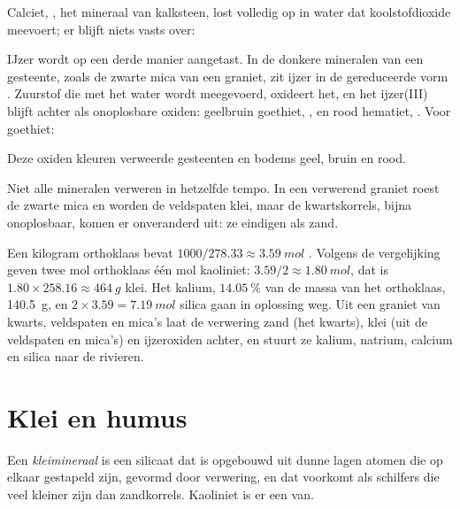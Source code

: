 \begin{proposition}\label{prop:g10:soil-formation:calcite}
Calciet, , het mineraal van kalksteen, lost volledig op in water dat
koolstofdioxide meevoert; er blijft niets vasts over:
\begin{center}
\end{center}
\end{proposition}

IJzer wordt op een derde manier aangetast. In de donkere mineralen van een
gesteente, zoals de zwarte mica van een graniet, zit ijzer in de gereduceerde
vorm . Zuurstof die met het water wordt meegevoerd, oxideert het, en
het ijzer(III) blijft achter als onoplosbare oxiden: geelbruin goethiet,
, en rood hematiet, . Voor goethiet:
\begin{center}
\end{center}
Deze oxiden kleuren verweerde gesteenten en bodems geel, bruin en rood.

Niet alle mineralen verweren in hetzelfde tempo. In een verwerend graniet roest
de zwarte mica en worden de veldspaten klei, maar de kwartskorrels, bijna
onoplosbaar, komen er onveranderd uit: ze eindigen als zand.

\begin{example}\label{ex:g10:soil-formation:granite}
Een kilogram orthoklaas bevat $1000/278.33 \approx \qty{3.59}{mol}$
. Volgens de vergelijking geven twee mol orthoklaas één mol
kaoliniet: $3.59/2 \approx \qty{1.80}{mol}$, dat is $1.80 \times 258.16
\approx \qty{464}{g}$ klei. Het kalium, $14.05~\%$ van de massa van het
orthoklaas, \qty{140.5}{g}, en $2 \times 3.59 = \qty{7.19}{mol}$ silica
gaan in oplossing weg. Uit een graniet van kwarts, veldspaten en mica's laat de
verwering zand (het kwarts), klei (uit de veldspaten en mica's) en ijzeroxiden
achter, en stuurt ze kalium, natrium, calcium en silica naar de rivieren.
\end{example}

\section{Klei en humus}

\begin{definition}[Kleimineraal]\label{def:g10:soil-formation:clay}
Een \emph{kleimineraal} is een silicaat dat is opgebouwd uit
dunne lagen atomen die op elkaar gestapeld zijn, gevormd door verwering, en dat
voorkomt als schilfers die veel kleiner zijn dan zandkorrels. Kaoliniet is er een van.
\end{definition}

